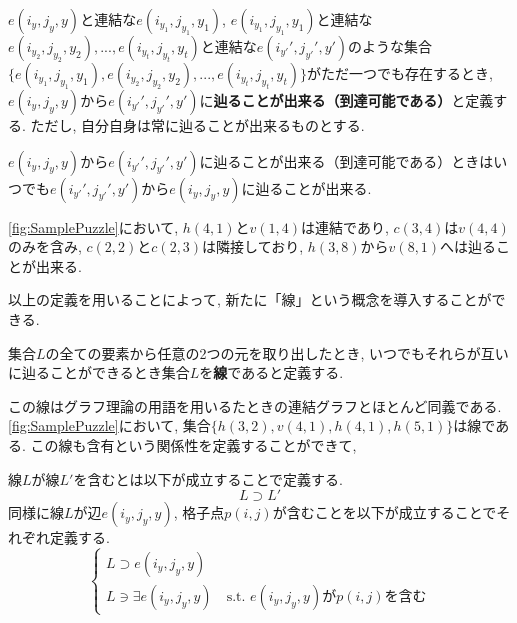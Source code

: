 \begin{definition}[到達可能]
  $e(i_y,j_y,y)$と連結な$e(i_{y_1},j_{y_1},y_1)$, $e(i_{y_1},j_{y_1},y_1)$と連結な$e(i_{y_2},j_{y_2},y_2),...,e(i_{y_t},j_{y_t},y_t)$と連結な$e(i_{y'}',j_{y'}',y')$のような集合\\
  $\{e(i_{y_1},j_{y_1},y_1),e(i_{y_2},j_{y_2},y_2),...,e(i_{y_t},j_{y_t},y_t)\}$がただ一つでも存在するとき, $e(i_y,j_y,y)$から$e(i_{y'}',j_{y'}',y')$に\textbf{辿ることが出来る（到達可能である）}と定義する. ただし, 自分自身は常に辿ることが出来るものとする.
\end{definition}

\begin{remark}
  $e(i_y,j_y,y)$から$e(i_{y'}',j_{y'}',y')$に辿ることが出来る（到達可能である）ときはいつでも$e(i_{y'}',j_{y'}',y')$から$e(i_y,j_y,y)$に辿ることが出来る.
\end{remark}

\begin{example}[連結, 含有, 隣接, 到達可能]
  \cref{fig:SamplePuzzle}において, $h(4,1)$と$v(1,4)$は連結であり, $c(3,4)$は$v(4,4)$のみを含み, $c(2,2)$と$c(2,3)$は隣接しており, $h(3,8)$から$v(8,1)$へは辿ることが出来る.
\end{example}
以上の定義を用いることによって, 新たに「線」という概念を導入することができる.

\begin{definition}[線]\label{definition:Line}
  集合$L$の全ての要素から任意の2つの元を取り出したとき, いつでもそれらが互いに辿ることができるとき集合$L$を\textbf{線}であると定義する.
\end{definition}
この線はグラフ理論の用語を用いるたときの連結グラフとほとんど同義である. \cref{fig:SamplePuzzle}において, 集合$\{h(3,2),v(4,1),h(4,1),h(5,1)\}$は線である. この線も含有という関係性を定義することができて,
\begin{definition}[線の含有]
  線$L$が線$L'$を含むとは以下が成立することで定義する.
  \begin{equation*}
    L\supset L'
  \end{equation*}
  同様に線$L$が辺$e(i_y,j_y,y)$, 格子点$p(i,j)$が含むことを以下が成立することでそれぞれ定義する.
  \begin{equation*}
    \begin{cases}
      {L\supset  e(i_y,j_y,y) } \\
      {L\ni \exists e(i_y,j_y,y) \quad \mbox{s.t. $e(i_y,j_y,y)$が$p(i,j)$を含む}}
    \end{cases}
  \end{equation*}
\end{definition}

